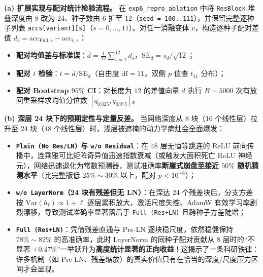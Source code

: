 
\textbf{(a) 扩展实现与配对统计检验流程。}
在 \texttt{exp6\_repro\_ablation} 中将 \texttt{ResBlock} 堆叠深度由 $8$ 改为 $24$、种子数由 $6$ 扩至 $12$（\texttt{seed = 100..111}），并保留完整逐种子列表 \texttt{accs[variant][s]}（$s = 0,\dots,11$）。对任一消融变体 $v$，构造逐种子配对差值 $d_s = \mathrm{acc}_{\text{Full}, s} - \mathrm{acc}_{v, s}$：
\begin{itemize}
  \item \textbf{配对均值差与标准误}：$\bar{d} = \frac{1}{12}\sum_{s=1}^{12} d_s$，$\mathrm{SE}_d = s_d / \sqrt{12}$；
  \item \textbf{配对 $t$ 检验}：$t = \bar{d} / \mathrm{SE}_d$（自由度 $\mathrm{df} = 11$，双侧 $p$ 值查 $t_{11}$ 分布）；
  \item \textbf{配对 Bootstrap $95\%$ CI}：对长度为 $12$ 的差值向量 $d$ 执行 $B = 5000$ 次有放回重采样求均值分位数 $[q_{0.025}, q_{0.975}]$。
\end{itemize}

\textbf{(b) 深层 24 块下的预期定性与定量反差。}
当网络深度从 $8$ 块（$16$ 个线性层）拉升至 $24$ 块（$48$ 个线性层）时，浅层被遮掩的动力学病灶会全面爆发：
\begin{itemize}
  \item \textbf{\texttt{Plain (No Res/LN)} 与 \texttt{w/o Residual}}：在 48 层无恒等跳连的 ReLU 前向传播中，连乘雅可比矩阵奇异值迅速指数衰减（或触发大面积死亡 ReLU 神经元），网络迅速退化为常数预测器，测试准确率\textbf{断崖式崩盘至接近 $50\%$ 随机猜测水平}（比完整版低 $25\% \sim 30\%$ 以上，配对 $p < 10^{-6}$）；
  \item \textbf{\texttt{w/o LayerNorm}（24 块有残差但无 LN）}：在深达 24 个残差块后，分支方差按 $\mathrm{Var}(h_\ell) \propto 1 + \ell$ 逐层累积放大，激活尺度失控、AdamW 有效学习率剧烈漂移，导致测试准确率显著落后于 \texttt{Full (Res+LN)} 且跨种子方差陡增；
  \item \textbf{\texttt{Full (Res+LN)}}：凭借残差直通与 Pre-LN 逐块稳尺度，依然稳健保持 $78\% \sim 82\%$ 的高准确率，此时 LayerNorm 的同种子配对贡献从 8 层时的“不显著 $+0.47\%$”一举跃升为\textbf{高度统计显著的正向收益}！这揭示了一条科研铁律：许多机制（如 Pre-LN、残差缩放）的真实价值只有在恰当的深度/尺度压力区间才会显现。
\end{itemize}


